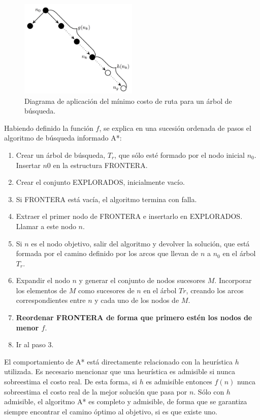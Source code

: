 \documentclass[a4paper,10pt]{article}
\begin{document}
\begin{figure}[H]
	\centering
    \includegraphics[width=0.50\textwidth]{images/graph.png}
    \caption{Diagrama de aplicación del mínimo costo de ruta para un árbol de búsqueda.}
    \label{fig:graph}
\end{figure}
	
Habiendo definido la función $f$, se explica en una sucesión ordenada de pasos el algoritmo de búsqueda informado A*:
\begin{enumerate}
\item Crear un árbol de búsqueda, $T_{r}$, que sólo esté formado por el nodo inicial $n_{0}$. Insertar $n{0}$ en la estructura FRONTERA.
\item Crear el conjunto EXPLORADOS, inicialmente vacío.
\item Si FRONTERA está vacía, el algoritmo termina con falla.
\item Extraer el primer nodo de FRONTERA e insertarlo en EXPLORADOS. Llamar a este nodo $n$.
\item Si $n$ es el nodo objetivo, salir del algoritmo y devolver la solución, que está formada por el camino definido por los arcos que llevan de $n$ a $n_{0}$ en el árbol $T_{r}$.
\item Expandir el nodo $n$ y generar el conjunto de nodos sucesores $M$. Incorporar los elementos de $M$ como sucesores de $n$ en el árbol $T{r}$, creando los arcos correspondientes entre $n$ y cada uno de los nodos de $M$.
\item \textbf{Reordenar FRONTERA de forma que primero estén los nodos de menor $f$}.
\item Ir al paso 3.
\end{enumerate}

El comportamiento de A* está directamente relacionado con la heurística $h$ utilizada. Es necesario mencionar que una heurística es admisible si nunca sobreestima el costo real. De esta forma, si $h$ es admisible entonces $f(n)$ nunca sobreestima el costo real de la mejor solución que pasa por $n$. Sólo con $h$ admisible, el algoritmo A* es completo y admisible, de forma que se garantiza siempre encontrar el camino óptimo al objetivo, si es que existe uno.
\end{document}
